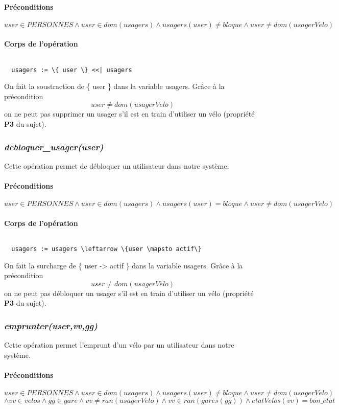 \documentclass[12pt]{article}
\begin{document}
\paragraph{Préconditions}
\[user \in PERSONNES \land user \in dom(usagers) \land usagers(user) \neq bloque \land user \neq dom(usagerVelo) \]

\paragraph{Corps de l'opération}
\[\]
\begin{lstlisting}
  usagers := \{ user \} <<| usagers
\end{lstlisting}

On fait la soustraction de \{ user \} dans la variable usagers. Grâce à la précondition \[ user \neq dom(usagerVelo) \] on ne peut pas supprimer un usager s'il est en train d'utiliser un vélo (propriété \textbf{P3} du sujet).

\subsubsection{\textit{debloquer\_usager(user)}}
Cette opération permet de débloquer un utilisateur dans notre système.
\paragraph{Préconditions}
\[ user \in PERSONNES \land user \in dom(usagers) \land usagers(user) = bloque \land user \neq dom(usagerVelo) \]

\paragraph{Corps de l'opération}
\[\]
\begin{lstlisting}
  usagers := usagers \leftarrow \{user \mapsto actif\}
\end{lstlisting}
On fait la surcharge de \{ user -> actif \} dans la variable usagers. Grâce à la précondition \[ user \neq dom(usagerVelo) \] on ne peut pas débloquer un usager s'il est en train d'utiliser un vélo (propriété \textbf{P3} du sujet).
\subsubsection{\textit{emprunter(user,vv,gg)}}
Cette opération permet l'emprunt d'un vélo par un utilisateur dans notre système.
\paragraph{Préconditions}
\[ user \in PERSONNES \land user \in dom(usagers) \land usagers(user) \neq bloque \land user \neq dom(usagerVelo) \]\[\land vv \in velos \land gg \in gare \land vv \neq ran(usagerVelo) \land vv \in ran(gares(gg)) \land etatVelos(vv) = bon\_etat\]
\end{document}
